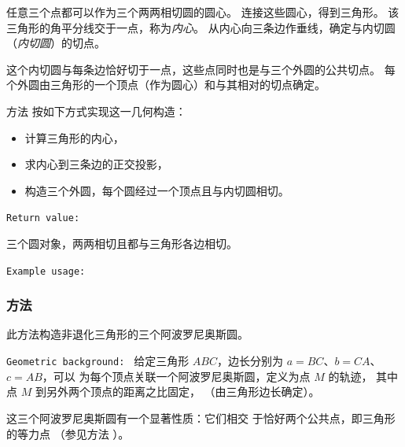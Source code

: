任意三个点都可以作为三个两两相切圆的圆心。
连接这些圆心，得到三角形。
该三角形的角平分线交于一点，称为\emph{内心}。
从内心向三条边作垂线，确定与内切圆（\emph{内切圆}）的切点。

\medskip
这个内切圆与每条边恰好切于一点，这些点同时也是与三个外圆的公共切点。
每个外圆由三角形的一个顶点（作为圆心）和与其相对的切点确定。

\medskip
方法  按如下方式实现这一几何构造：
\begin{itemize}
  \item 计算三角形的内心，
  \item 求内心到三条边的正交投影，
  \item 构造三个外圆，每个圆经过一个顶点且与内切圆相切。
\end{itemize}


\texttt{Return value: }

三个圆对象，两两相切且都与三角形各边相切。


\texttt{Example usage: }

\begin{tkzexample}[latex=.45\textwidth]
\begin{center}
\end{center}
 \end{tkzexample}

\subsubsection{方法 }
\label{ssub:three_apollonius_circles}

此方法构造非退化三角形的三个阿波罗尼奥斯圆。

\medskip
\texttt{Geometric background: }
给定三角形 $ABC$，边长分别为 $a = BC$、$b = CA$、$c = AB$，可以
为每个顶点关联一个阿波罗尼奥斯圆，定义为点 $M$ 的轨迹，
其中点 $M$ 到另外两个顶点的距离之比固定，
（由三角形边长确定）。

这三个阿波罗尼奥斯圆有一个显著性质：它们相交
于恰好两个公共点，即三角形的等力点
（参见方法 ）。

